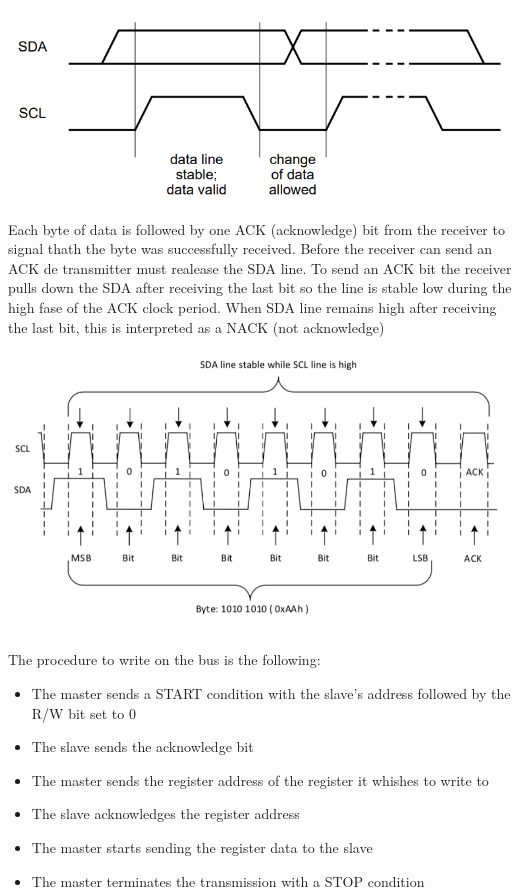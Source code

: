 \documentclass[]{article}
\begin{document}
\begin{center}
    \includegraphics[scale=0.5]{bit_transfer}
\end{center}
Each byte of data is followed by one ACK (acknowledge) bit from the receiver to signal thath the byte was successfully received. Before the receiver can send an ACK 
de transmitter must realease the SDA line. To send an ACK bit the receiver pulls down the SDA after receiving the last bit so the line is stable low during the high 
fase of the ACK clock period. When SDA line remains high after receiving the last bit, this is interpreted as a NACK (not acknowledge)

\begin{center}
    \includegraphics[scale=0.5]{byte_transmission}
\end{center}

The procedure to write on the bus is the following:
\begin{itemize}
    \item The master sends a START condition with the slave's address followed by the R/W bit set to 0
    \item The slave sends the acknowledge bit 
    \item The master sends the register address of the register it whishes to write to 
    \item The slave acknowledges the register address
    \item The master starts sending the register data to the slave 
    \item The master terminates the transmission with a STOP condition
\end{itemize}
\end{document}
